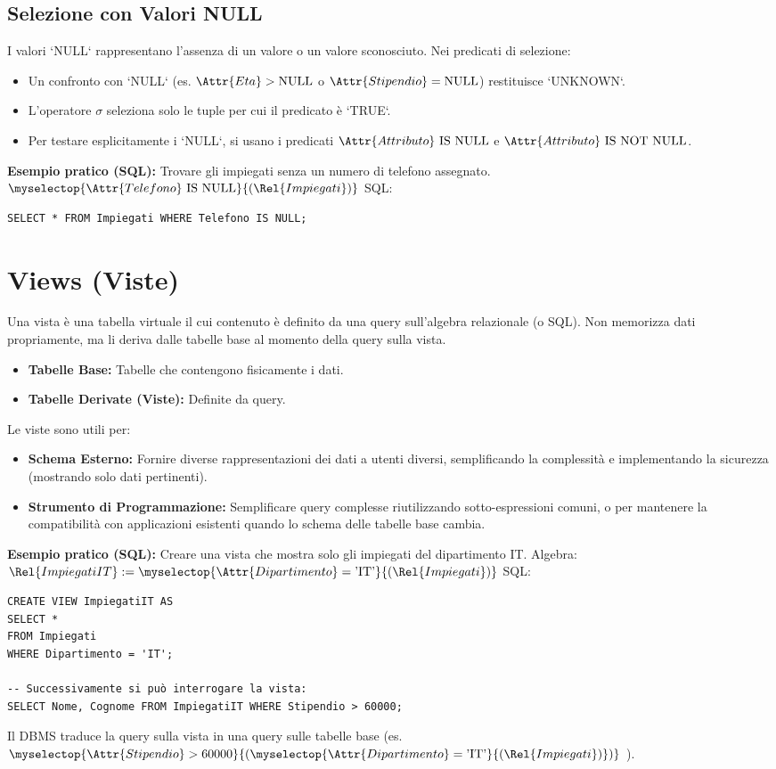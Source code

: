 \subsection{Selezione con Valori NULL}
I valori `NULL` rappresentano l'assenza di un valore o un valore sconosciuto.
Nei predicati di selezione:
\begin{itemize}
	\item Un confronto con `NULL` (es. $\Attr{Eta} > \text{NULL}$ o $\Attr{Stipendio} = \text{NULL}$) restituisce `UNKNOWN`.
	\item L'operatore $\sigma$ seleziona solo le tuple per cui il predicato è `TRUE`.
	\item Per testare esplicitamente i `NULL`, si usano i predicati $\Attr{Attributo} \text{ IS NULL}$ e $\Attr{Attributo} \text{ IS NOT NULL}$.
\end{itemize}
\textbf{Esempio pratico (SQL):} Trovare gli impiegati senza un numero di telefono assegnato.
$\myselectop{\Attr{Telefono} \text{ IS NULL}}{(\Rel{Impiegati})}$
SQL:
\begin{verbatim}
SELECT * FROM Impiegati WHERE Telefono IS NULL;
\end{verbatim}

\section{Views (Viste)}
Una vista è una tabella virtuale il cui contenuto è definito da una query sull'algebra relazionale (o SQL). Non memorizza dati propriamente, ma li deriva dalle tabelle base al momento della query sulla vista.
\begin{itemize}
	\item \textbf{Tabelle Base:} Tabelle che contengono fisicamente i dati.
	\item \textbf{Tabelle Derivate (Viste):} Definite da query.
\end{itemize}
Le viste sono utili per:
\begin{itemize}
	\item \textbf{Schema Esterno:} Fornire diverse rappresentazioni dei dati a utenti diversi, semplificando la complessità e implementando la sicurezza (mostrando solo dati pertinenti).
	\item \textbf{Strumento di Programmazione:} Semplificare query complesse riutilizzando sotto-espressioni comuni, o per mantenere la compatibilità con applicazioni esistenti quando lo schema delle tabelle base cambia.
\end{itemize}
\textbf{Esempio pratico (SQL):} Creare una vista che mostra solo gli impiegati del dipartimento IT.
Algebra: $\Rel{ImpiegatiIT} := \myselectop{\Attr{Dipartimento} = \text{'IT'}}{(\Rel{Impiegati})}$
SQL:
\begin{verbatim}
CREATE VIEW ImpiegatiIT AS
SELECT *
FROM Impiegati
WHERE Dipartimento = 'IT';

-- Successivamente si può interrogare la vista:
SELECT Nome, Cognome FROM ImpiegatiIT WHERE Stipendio > 60000;
\end{verbatim}
Il DBMS traduce la query sulla vista in una query sulle tabelle base (es. $\myselectop{\Attr{Stipendio} > 60000}{(\myselectop{\Attr{Dipartimento} = \text{'IT'}}{(\Rel{Impiegati})})}$ ).

